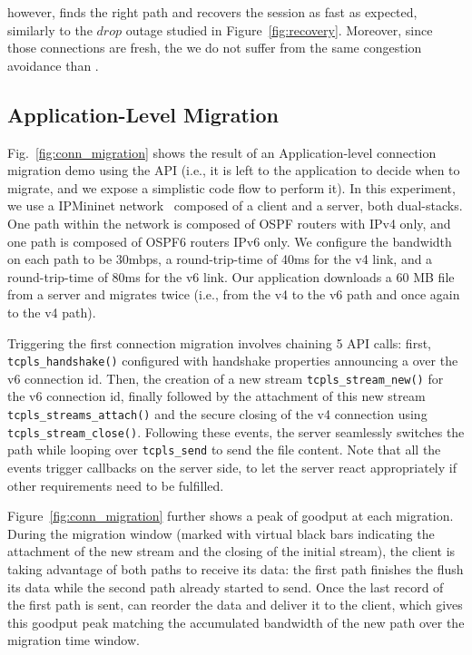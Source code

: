 \tcpls however, finds the right path and recovers the session as fast as
expected, similarly to the $drop$ outage studied in Figure~\ref{fig:recovery}.
Moreover, since those connections are fresh, the we do not suffer from the same
congestion avoidance than \mptcp.

\subsection{Application-Level Migration}

Fig.~\ref{fig:conn_migration} shows the result of an Application-level
connection migration demo using the API (i.e., it is left to the application to
decide when to migrate, and we expose a simplistic code flow to perform it). In
this experiment, we use a IPMininet network~\cite{ipmininet,
  jadin2020educational} composed of a client and a server, both
dual-stacks. One path within the network is composed of OSPF routers with IPv4
only, and one path is composed of OSPF6 routers IPv6 only. We configure the
bandwidth on each path to be 30mbps, a round-trip-time of 40ms for the v4 link,
and a round-trip-time of 80ms for the v6 link. Our application downloads
a 60 MB file from a server and migrates twice (i.e., from the v4 to the v6 path
and once again to the v4 path).

Triggering the first connection migration involves chaining 5 API calls: first,
\texttt{tcpls\_handshake()} configured with handshake properties announcing a
\join over the v6 connection id. Then, the creation of a new stream
\texttt{tcpls\_stream\_new()} for the v6 connection id, finally followed by the
attachment of this new stream \texttt{tcpls\_streams\_attach()} and the secure
closing of the v4 \tcp connection using \texttt{tcpls\_stream\_close()}.
Following these events, the server seamlessly switches the path while looping
over \texttt{tcpls\_send} to send the file content. Note that all the events
trigger callbacks on the server side, to let the server react appropriately if
other requirements need to be fulfilled.

Figure~\ref{fig:conn_migration} further shows a peak of goodput at each
migration. During the migration window (marked with virtual black bars
indicating the attachment of the new stream and the closing of the initial
stream), the client is taking advantage of both paths to receive its data: the
first path finishes the flush its data while the second path already started to
send. Once the last record of the first path is sent, \tcpls can reorder the
data and deliver it to the client, which gives this goodput peak matching the
accumulated bandwidth of the new path over the migration time window.

